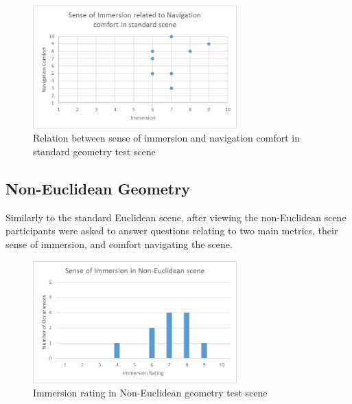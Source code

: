 			\begin{figure}[H]
				\includegraphics[width=0.7\textwidth]{Images/Standard_Relation}
				\centering
				\caption{Relation between sense of immersion and navigation comfort in standard geometry test scene}
				\label{exp:fig:standard_relation}
			\end{figure}

		\subsection{Non-Euclidean Geometry}
		\label{exp:exp:ne}

			Similarly to the standard Euclidean scene, after viewing the non-Euclidean scene participants were asked to answer questions relating to two main metrics, their sense of immersion, and comfort navigating the scene.



			\begin{figure}[H]
				\includegraphics[width=0.7\textwidth]{Images/NE_Immersion}
				\centering
				\caption{Immersion rating in Non-Euclidean geometry test scene}
				\label{exp:fig:ne_immersion}
			\end{figure}


